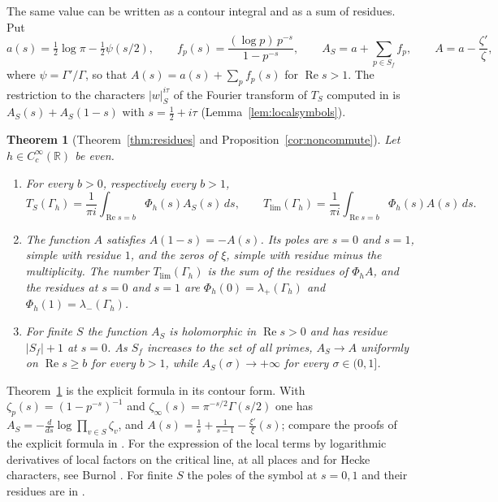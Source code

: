 \documentclass[11pt]{amsart}
\newtheorem{theorem}{Theorem}[section]
\theoremstyle{remark}
\numberwithin{equation}{section}
\newcommand{\R}{\mathbb R}
\newcommand{\Rel}{\operatorname{Re}}
\newcommand{\Tl}{T_{\lim}}
\begin{document}
The same value can be written as a contour integral and as a sum of
residues.  Put
\[
  a(s)=\tfrac12\log\pi-\tfrac12\psi(s/2),\qquad
  f_p(s)=\frac{(\log p)\,p^{-s}}{1-p^{-s}},\qquad
  A_S=a+\sum_{p\in S_f}f_p,\qquad A=a-\frac{\zeta'}{\zeta},
\]
where $\psi=\Gamma'/\Gamma$, so that $A(s)=a(s)+\sum_pf_p(s)$ for
$\Rel s>1$.  The restriction to the characters $|w|_S^{i\tau}$ of the
Fourier transform of $T_S$ computed in \cite{P43} is $A_S(s)+A_S(1-s)$ with
$s=\frac12+i\tau$ (Lemma~\ref{lem:localsymbols}).

\begin{theorem}[Theorem~\ref{thm:residues} and
Proposition~\ref{cor:noncommute}]
\label{thm:introB}
Let $h\in C_c^\infty(\R)$ be even.
\begin{enumerate}
\item[(i)] For every $b>0$, respectively every $b>1$,
\[
  T_S(\Gamma_h)=\frac1{\pi i}\int_{\Rel s=b}\Phi_h(s)A_S(s)\,ds,\qquad
  \Tl(\Gamma_h)=\frac1{\pi i}\int_{\Rel s=b}\Phi_h(s)A(s)\,ds .
\]
\item[(ii)] The function $A$ satisfies $A(1-s)=-A(s)$.  Its poles are $s=0$
and $s=1$, simple with residue $1$, and the zeros of $\xi$, simple with
residue minus the multiplicity.  The number $\Tl(\Gamma_h)$ is the sum of
the residues of $\Phi_hA$, and the residues at $s=0$ and $s=1$ are
$\Phi_h(0)=\lambda_+(\Gamma_h)$ and $\Phi_h(1)=\lambda_-(\Gamma_h)$.
\item[(iii)] For finite $S$ the function $A_S$ is holomorphic in $\Rel s>0$
and has residue $|S_f|+1$ at $s=0$.  As $S_f$ increases to the set of all
primes, $A_S\to A$ uniformly on $\Rel s\ge b$ for every $b>1$, while
$A_S(\sigma)\to+\infty$ for every $\sigma\in(0,1]$.
\end{enumerate}
\end{theorem}

Theorem~\ref{thm:introB} is the explicit formula in its contour form.  With
$\zeta_p(s)=(1-p^{-s})^{-1}$ and $\zeta_\infty(s)=\pi^{-s/2}\Gamma(s/2)$ one
has $A_S=-\frac{d}{ds}\log\prod_{v\in S}\zeta_v$, and
$A(s)=\frac1s+\frac1{s-1}-\frac{\xi'}{\xi}(s)$; compare the proofs of the
explicit formula in \cite{Weil1952,Barner1981}.  For the expression of the
local terms by logarithmic derivatives of local factors on the critical
line, at all places and for Hecke characters, see Burnol
\cite{BurnolCR,BurnolConductor}.  For finite $S$ the poles of the symbol at
$s=0,1$ and their residues are in \cite[Theorem~5.13]{P43}.
\end{document}

